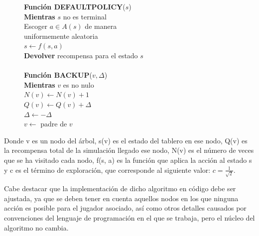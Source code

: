 \documentclass[conference,a4paper]{IEEEtran}
\begin{document}
\begin{figure}[H]
\begin{pseudo}
    \textbf{Función DEFAULTPOLICY}($s$) \\
    \> \textbf{Mientras} $s$ no es terminal \\
    \> \> Escoger $a \in A(s)$ de manera \\
    \> \> uniformemente aleatoria \\
    \> \> $s \leftarrow f(s,a)$ \\
    \> \textbf{Devolver} recompensa para el estado $s$ \\

    \\

    \textbf{Función BACKUP}($v, \Delta$) \\
    \> \textbf{Mientras} $v$ es no nulo \\
    \> \> $N(v) \leftarrow N(v) + 1$ \\
    \> \> $Q(v) \leftarrow Q(v) + \Delta$ \\
    \> \> $\Delta \leftarrow -\Delta$ \\
    \> \> $v \leftarrow$ padre de $v$
  \end{pseudo}
  \label{pcd:uct}
\end{figure}

Donde v es un nodo del árbol, s(v) es el estado del tablero en ese nodo, Q(v) es la recompensa total de 
la simulación llegado ese nodo, N(v) es el número de veces que se ha visitado cada nodo, f(s, a) es la función 
que aplica la acción al estado s y c es el término de exploración, que corresponde al siguiente valor: $c = \frac{1}{\sqrt{2}}.$

Cabe destacar que la implementación de dicho algoritmo en código debe ser ajustada, ya que se deben tener en cuenta aquellos nodos 
en los que ninguna acción es posible para el jugador asociado, así como otros detalles causados por convenciones del lenguaje de 
programación en el que se trabaja, pero el núcleo del algoritmo no cambia.
\end{document}
